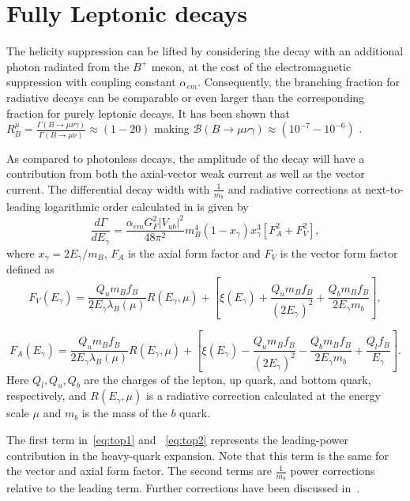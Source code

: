 \section{Fully Leptonic  decays}
\label{lnugamma}
The helicity suppression can be lifted by considering the decay with an additional photon radiated from the $B^{+}$ meson, at the cost of the electromagnetic suppression with coupling constant $\alpha_{em}$. Consequently, the branching fraction for radiative decays can be comparable or even larger than the corresponding fraction for purely leptonic decays. It has been shown that $R^{\mu}_{B}=\frac{\Gamma(B\rightarrow \mu \nu \gamma)}{\Gamma(B\rightarrow \mu \nu)}\approx(1-20)$ making $\mathcal{B}(B\rightarrow \mu \nu \gamma)\approx(10^{-7}-10^{-6})$ \cite{Burdman:1994ip}.

As compared to photonless decays, the amplitude of the decay will have a contribution from both the axial-vector weak current as well as the vector current.
The differential decay width with $\frac{1}{m_{b}}$ and radiative corrections
at next-to-leading logarithmic order calculated in\cite{Beneke:2011nf} is given by
\begin{equation}
\frac{d\Gamma}{dE_{\gamma}} = \frac{\alpha_{em}G^{2}_{F}|V_{ub}|^{2}}{48 \pi^{2}}m_{B}^{4}(1 - x_{\gamma})x_{\gamma}^{3}[F_A^{2} + F_V^{2}],
\end{equation}
 where $x_{\gamma} = 2E_{\gamma}/m_{B}$, $F_A$ is the axial form factor and $F_V$  is the vector form factor defined as
\begin{equation}
F_{V}(E_{\gamma}) = \frac{Q_{u}m_{B}f_{B}}{2E_{\gamma}\lambda_{B}(\mu)} R(E_{\gamma}, \mu) + [\xi(E_\gamma) +  \frac{Q_{u}m_{B}f_{B}}{(2E_{\gamma})^{2}} + \frac{Q_{b}m_{B}f_{B}}{2E_{\gamma}m_{b}}],
\label{eq:top1}
\end{equation}

\begin{equation}
F_{A}(E_{\gamma}) = \frac{Q_{u}m_{B}f_{B}}{2E_{\gamma}\lambda_{B}(\mu)} R(E_{\gamma}, \mu) + [\xi(E_\gamma) -  \frac{Q_{u}m_{B}f_{B}}{(2E_{\gamma})^{2}} - \frac{Q_{b}m_{B}f_{B}}{2E_{\gamma}m_{b}} + \frac{Q_{l}f_{B}}{E_{\gamma}}].
\label{eq:top2}
\end{equation}
Here $Q_{l},Q_{u},Q_{b}$ are the charges of the lepton, up quark, and
bottom quark, respectively, and $R(E_{\gamma}, \mu)$ is a radiative correction
calculated at the energy scale $\mu$ %
and $m_{b}$ is the mass of the $b$ quark.

The first term in~\autoref{eq:top1} and ~\autoref{eq:top2} represents the leading-power contribution in the heavy-quark expansion. Note that this term
is the same for the vector and axial form factor. The second terms are $\frac{1}{m_{b}}$ power corrections relative to the leading term. Further corrections have been discussed in~\cite{Wang:2016beq}.



